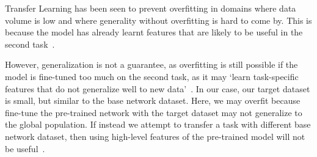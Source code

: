 \documentclass[12pt,twoside]{report}
\begin{document}
Transfer Learning has been seen to prevent overfitting in domains where data volume is low and where generality without overfitting is hard to come by. This is because the model has already learnt features that are likely to be useful in the second task~\cite{geeks-transfer-learning}. 

However, generalization is not a guarantee, as overfitting is still possible if the model is fine-tuned too much on the second task, as it may `learn task-specific features that do not generalize well to new data'~\cite{geeks-transfer-learning}. In our case, our target dataset is small, but similar to the base network dataset. Here, we may overfit because fine-tune the pre-trained network with the target dataset may not generalize to the global population. If instead we attempt to transfer a task with different base network dataset, then using high-level features of the pre-trained model will not be useful~\cite{geeks-transfer-learning}.






\end{document}
